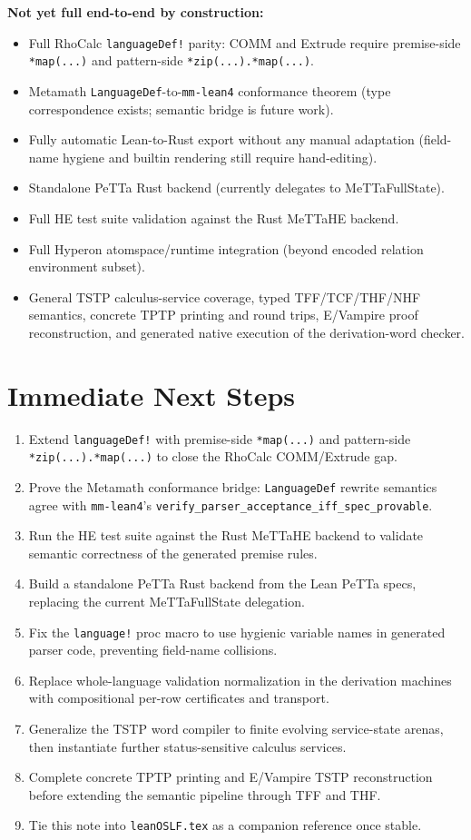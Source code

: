 \documentclass[11pt]{article}
\newcommand{\code}[1]{\texttt{#1}}
\begin{document}
\textbf{Not yet full end-to-end by construction:}
\begin{itemize}
\item Full RhoCalc \code{languageDef!} parity: COMM and Extrude require
  premise-side \code{*map(...)} and pattern-side \code{*zip(...).*map(...)}.
\item Metamath \code{LanguageDef}-to-\code{mm-lean4} conformance theorem
  (type correspondence exists; semantic bridge is future work).
\item Fully automatic Lean-to-Rust export without any manual adaptation
  (field-name hygiene and builtin rendering still require hand-editing).
\item Standalone PeTTa Rust backend (currently delegates to MeTTaFullState).
\item Full HE test suite validation against the Rust MeTTaHE backend.
\item Full Hyperon atomspace/runtime integration (beyond encoded relation
  environment subset).
\item General TSTP calculus-service coverage, typed TFF/TCF/THF/NHF
  semantics, concrete TPTP printing and round trips, E/Vampire proof
  reconstruction, and generated native execution of the derivation-word
  checker.
\end{itemize}

\section{Immediate Next Steps}

\begin{enumerate}
\item Extend \code{languageDef!} with premise-side \code{*map(...)} and
  pattern-side \code{*zip(...).*map(...)} to close the RhoCalc COMM/Extrude gap.
\item Prove the Metamath conformance bridge: \code{LanguageDef} rewrite semantics
  agree with \code{mm-lean4}'s \code{verify\_parser\_acceptance\_iff\_spec\_provable}.
\item Run the HE test suite against the Rust MeTTaHE backend to validate
  semantic correctness of the generated premise rules.
\item Build a standalone PeTTa Rust backend from the Lean PeTTa specs,
  replacing the current MeTTaFullState delegation.
\item Fix the \code{language!} proc macro to use hygienic variable names
  in generated parser code, preventing field-name collisions.
\item Replace whole-language validation normalization in the derivation
  machines with compositional per-row certificates and transport.
\item Generalize the TSTP word compiler to finite evolving service-state
  arenas, then instantiate further status-sensitive calculus services.
\item Complete concrete TPTP printing and E/Vampire TSTP reconstruction
  before extending the semantic pipeline through TFF and THF.
\item Tie this note into \code{leanOSLF.tex} as a companion reference once stable.
\end{enumerate}
\end{document}
